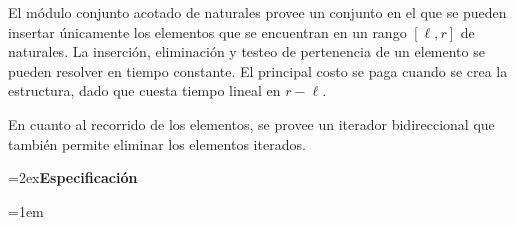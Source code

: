\documentclass[a4paper,10pt]{article}
\begin{document}
El módulo conjunto acotado de naturales provee un conjunto en el que se pueden insertar únicamente los elementos que se encuentran en un rango $[\ell, r]$ de naturales.  La inserción, eliminación y testeo de pertenencia de un elemento se pueden resolver en tiempo constante.  El principal costo se paga cuando se crea la estructura, dado que cuesta tiempo lineal en $r - \ell$.

En cuanto al recorrido de los elementos, se provee un iterador bidireccional que también permite eliminar los elementos iterados.

{\parskip=2ex\noindent\Large \textbf{Especificación}\par}

\begin{tad}{}
  \parskip=0pt

  {
  \tadAnchoEncabezados=1em
  }

  \tadObservadores

  \tadGeneradores

  \tadOtrasOperaciones
  \tadNoAlinearFunciones

  \tadAxiomas
\end{tad}
\end{document}
